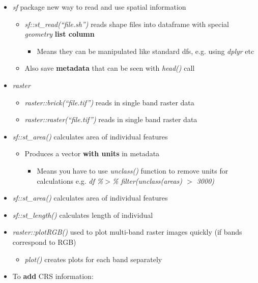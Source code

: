 \documentclass{article}
\begin{document}
\begin{itemize}
    \item \textit{sf} package new way to read and use spatial information
    \begin{itemize}
        \item \textit{sf::st\_read(``file.sh'')} reads shape files into dataframe with special \textit{geometry} \textbf{list column}
        \begin{itemize}
            \item Means they can be manipulated like standard dfs, e.g. using \textit{dplyr} etc
        \end{itemize}
        \item Also save \textbf{metadata} that can be seen with \textit{head()} call
    \end{itemize}
    \item \textit{raster}
    \begin{itemize}
        \item \textit{raster::brick(``file.tif'')} reads in single band raster data
        \item \textit{raster::raster(``file.tif'')} reads in single band raster data
    \end{itemize}
    \item \textit{sf::st\_area()} calculates area of individual features
    \begin{itemize}
        \item Produces a vector \textbf{with units} in metadata
        \begin{itemize}
            \item Means you have to use \textit{unclass()} function to remove units for calculations e.g. \textit{df \%$>$\% filter(unclass(areas) $>$ 3000)}
        \end{itemize}
    \end{itemize}
    \item \textit{sf::st\_area()} calculates area of individual features
    \item \textit{sf::st\_length()} calculates length of individual
    \item \textit{raster::plotRGB()} used to plot multi-band raster images quickly (if bands correspond to RGB)
    \begin{itemize}
        \item \textit{plot()} creates plots for each band separately
    \end{itemize}
    \item To \textbf{add} CRS information:

\end{itemize}
\end{document}

